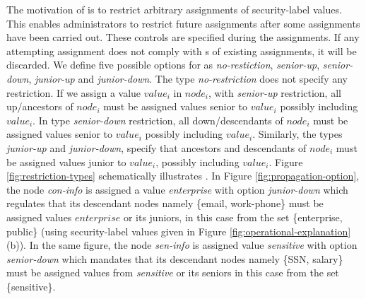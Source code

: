  
 
 The motivation of \assignmentControl{} is to restrict arbitrary assignments of security-label values. This enables administrators to restrict future assignments after some assignments have been carried out.  These controls are specified during the assignments. If any attempting assignment does not comply with \assignmentControl{}s of existing assignments, it will be discarded. We define five possible options for \assignmentControl{} as \textit{no-restiction}, \textit{senior-up}, \textit{senior-down}, \textit{junior-up} and \textit{junior-down}. The type \textit{no-restriction} does not specify any restriction. If we assign a value $value_i$ in $node_i$, with \textit{senior-up} restriction, all up/ancestors of $node_i$ must be assigned values senior to $value_i$ possibly including $value_i$. In type \textit{senior-down} restriction, all down/descendants of $node_i$ must be assigned values senior to $value_i$ possibly including $value_i$.  Similarly, the types \textit{junior-up} and \textit{junior-down}, specify that ancestors and descendants of $node_i$ must be assigned  values junior to $value_i$, possibly including $value_i$.  Figure \ref{fig:restriction-types} schematically illustrates \assignmentControl{}. In Figure \ref{fig:propagation-option}, the node \textit{con-info} is assigned a value \textit{enterprise} with option \textit{junior-down} which regulates that its descendant nodes namely \{email, work-phone\} must be assigned values $enterprise$ or its juniors, in this case from the set \{enterprise, public\} (using security-label values given in Figure \ref{fig:operational-explanation}(b)). In the same figure, the node \textit{sen-info} is assigned value \textit{sensitive} with option \textit{senior-down} which mandates that its descendant nodes namely \{SSN, salary\} must be assigned values from \textit{sensitive} or its seniors in this case from the set \{sensitive\}.


